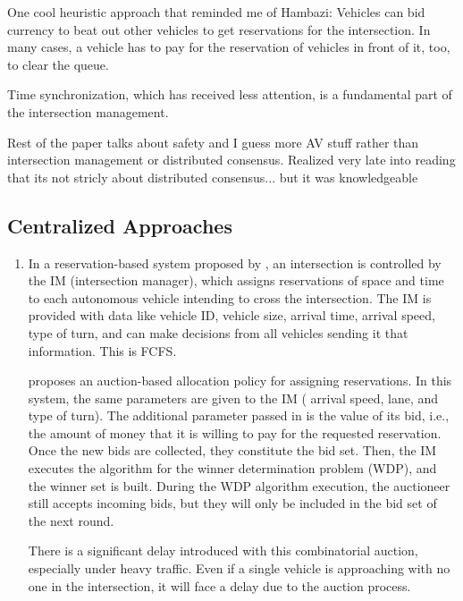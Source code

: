 \documentclass[fleqn,10pt]{olplainarticle}
\begin{document}
\begin{enumerate}
One cool heuristic approach that reminded me of Hambazi: Vehicles can bid currency to beat out other vehicles to get reservations for the intersection. In many cases, a vehicle has to pay for the reservation of vehicles in front of it, too, to clear the queue. \cite{Vasirani_2012}



Time synchronization, which has received less attention, is a fundamental part of the intersection management. 


Rest of the paper talks about safety and I guess more AV stuff rather than intersection management or distributed consensus.
Realized very late into reading that its not stricly about distributed consensus... but it was knowledgeable


\end{enumerate}


\subsection{Centralized Approaches}
\begin{enumerate}
    \item
In a reservation-based system proposed by \cite{dresner}, an intersection is controlled by the IM (intersection manager), which assigns reservations of space and time to each autonomous vehicle intending to cross the intersection. The IM is provided with data like vehicle ID, vehicle size, arrival time, arrival speed, type of turn, and can make decisions from all vehicles sending it that information. This is FCFS. 

\cite{Vasirani_2012} proposes an auction-based allocation policy for assigning reservations. In this system, the same parameters are given to the IM ( arrival speed, lane, and type of turn). The additional parameter passed in is the value of its bid, i.e., the amount of money that it is willing to pay for the requested reservation. Once the new bids are collected, they constitute the bid set. Then, the IM executes the algorithm for the winner determination problem (WDP), and the winner set is built. During the WDP algorithm execution, the auctioneer still accepts incoming bids, but they will only be included in the bid set of the next round.

There is a significant delay introduced with this combinatorial auction, especially under heavy traffic. Even if a single vehicle is approaching with no one in the intersection, it will face a delay due to the auction process. 





\end{enumerate}
\end{document}
